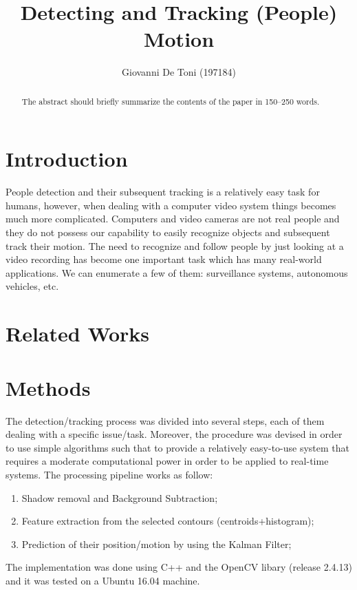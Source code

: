 \documentclass[runningheads]{llncs}
\begin{document}
%
\title{Detecting and Tracking (People) Motion}
%
%
\author{Giovanni De Toni (197184)}
%
%
%
\maketitle              %
%
\begin{abstract}
The abstract should briefly summarize the contents of the paper in
150--250 words.

\end{abstract}
%
%
%
\section{Introduction}
People detection and their subsequent tracking is a relatively easy task for humans, however, when dealing with a computer video system things becomes much more complicated. Computers and video cameras are not real people and they do not possess our capability to easily recognize objects and subsequent track their motion.  The need to recognize and follow people by just looking at a video recording has become one important task which has many real-world applications. We can enumerate a few of them: surveillance systems, autonomous vehicles, etc. 

\section{Related Works}

\section{Methods}

The detection/tracking process was divided into several steps, each of them dealing with a specific issue/task. Moreover, the procedure was devised in order to use simple algorithms such that to provide a relatively easy-to-use system that requires a moderate computational power in order to be applied to real-time systems. The processing pipeline works as follow:
\begin{enumerate}
\item Shadow removal and Background Subtraction;
\item Feature extraction from the selected contours (centroids+histogram);
\item Prediction of their position/motion by using the Kalman Filter;
\end{enumerate}
The implementation was done using C++ and the OpenCV libary (release 2.4.13) and it was tested on a Ubuntu 16.04 machine.
\end{document}
